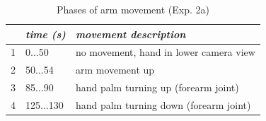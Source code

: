 \begin{table}[h]
\centering
\begin{tabular}{|c|l|l|}
\hline
 & \emph{time (s)} & \emph{movement description} \\
\hline
1 & 0$\dots$50 & no movement, hand in lower camera view \\
\hline
2 & 50$\dots$54 & arm movement up \\
\hline
3 & 85$\dots$90 & hand palm turning up (forearm joint) \\
\hline
4 & 125$\dots$130 & hand palm turning down (forearm joint) \\
\hline
\end{tabular}
\caption{Phases of arm movement (Exp. 2a)}
\label{tab:vic_arm_movement_phases}
\end{table}

\newlength{\imgwidth}
\setlength{\imgwidth}{0.26\textwidth}

